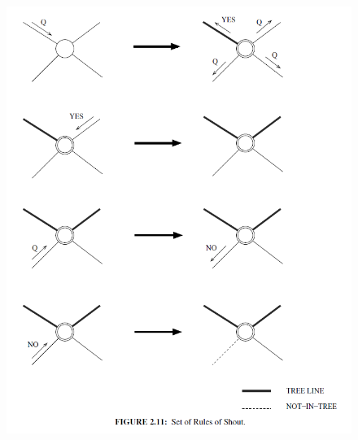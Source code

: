 \begin{figure}[H]
    \centering
    \hspace*{-0.75in}
    \includegraphics[width=15cm, keepaspectratio]{images/dddd.png}
\end{figure}

